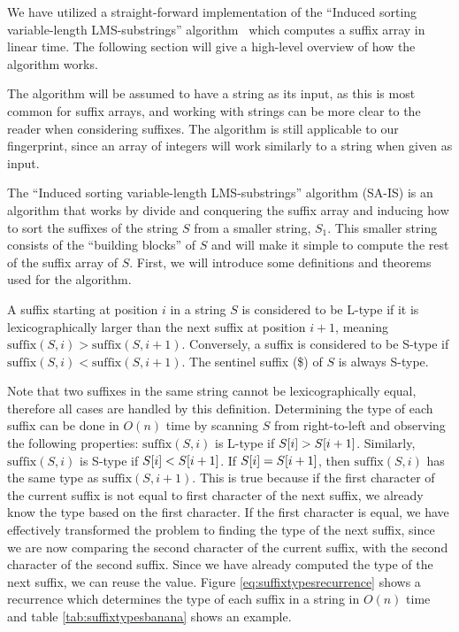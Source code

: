 We have utilized a straight-forward implementation of the ``Induced sorting
variable-length LMS-substrings'' algorithm~\cite{LinearTimeSuffixArraySAIS} which computes
a suffix array in linear time. The following section will give a high-level overview of
how the algorithm works. 

The algorithm will be assumed to have a string as its input, as this is most common for
suffix arrays, and working with strings can be more clear to the reader when considering
suffixes. The algorithm is still applicable to our fingerprint, since an array of integers
will work similarly to a string when given as input.

The ``Induced sorting variable-length LMS-substrings'' algorithm (SA-IS) is an algorithm
that works by divide and conquering the suffix array and inducing how to sort the suffixes
of the string $S$ from a smaller string, $S_1$. This smaller string consists of the
``building blocks'' of $S$ and will make it simple to compute the rest of the suffix array
of $S$. First, we will introduce some definitions and theorems used for the algorithm.

\begin{definition} A suffix starting at position $i$ in a
    string $S$ is considered to be L-type if it is lexicographically larger than the next
    suffix at position $i + 1$, meaning $\mathrm{suffix}(S, i) > \mathrm{suffix}(S, i+1)$.
    Conversely, a suffix is considered to be S-type if $\mathrm{suffix}(S, i) <
\mathrm{suffix}(S, i+1)$. The sentinel suffix (\$) of $S$ is always S-type.
\end{definition}

Note that two suffixes in the same string cannot be lexicographically equal, therefore all
cases are handled by this definition. Determining the type of each suffix can be done in
$O(n)$ time by scanning $S$ from right-to-left and observing the following properties:
$\mathrm{suffix}(S, i)$ is L-type if $S[{i}] > S[{i + 1}]$.
Similarly, $\mathrm{suffix}(S, i)$ is S-type if $S[{i}] < S[{i +
1}]$. If $S[{i}] = S[{i + 1}]$, then $\mathrm{suffix}(S, i)$ has
the same type as $\mathrm{suffix}(S, i + 1)$. This is true because if the first character
of the current suffix is not equal to first character of the next suffix, we already know
the type based on the first character. If the first character is equal, we have
effectively transformed the problem to finding the type of the next suffix, since we are
now comparing the second character of the current suffix, with the second character of the
second suffix. Since we have already computed the type of the next suffix, we can reuse
the value. Figure \ref{eq:suffixtypesrecurrence} shows a recurrence which determines the
type of each suffix in a string in $O(n)$ time and table \ref{tab:suffixtypesbanana} shows
an example.


